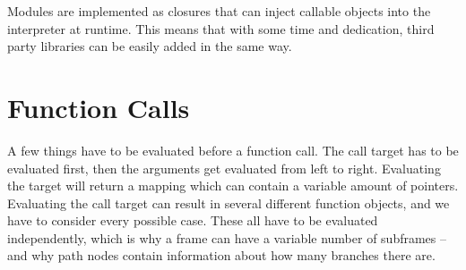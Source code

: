\documentclass[a4paper, 16pt, oneside]{Thesis}
\begin{document}
Modules are implemented as closures that can inject callable objects
into the interpreter at runtime. This means that with some time and
dedication, third party libraries can be easily added in the same way.

\section{Function Calls}\label{function-calls}

A few things have to be evaluated before a function call. The call
target has to be evaluated first, then the arguments get evaluated from
left to right. Evaluating the target will return a mapping which can
contain a variable amount of pointers. Evaluating the call target can
result in several different function objects, and we have to consider
every possible case. These all have to be evaluated independently, which
is why a frame can have a variable number of subframes -- and why path
nodes contain information about how many branches there are.
\end{document}
